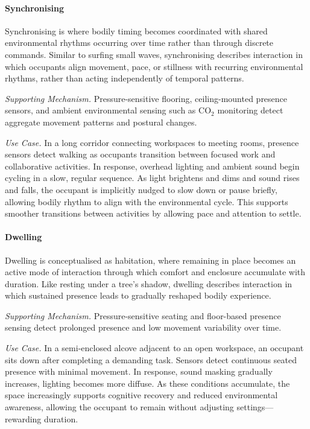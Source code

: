 \paragraph{\textbf{Synchronising}}
Synchronising is where bodily timing becomes coordinated with shared environmental rhythms occurring over time rather than through discrete commands. Similar to surfing small waves, synchronising describes interaction in which occupants align movement, pace, or stillness with recurring environmental rhythms, rather than acting independently of temporal patterns. 

\emph{Supporting Mechanism.} Pressure-sensitive flooring, ceiling-mounted presence sensors, and ambient environmental sensing such as CO$_2$ monitoring detect aggregate movement patterns and postural changes.

\emph{Use Case.} In a long corridor connecting workspaces to meeting rooms, presence sensors detect walking as occupants transition between focused work and collaborative activities. In response, overhead lighting and ambient sound begin cycling in a slow, regular sequence. As light brightens and dims and sound rises and falls, the occupant is implicitly nudged to slow down or pause briefly, allowing bodily rhythm to align with the environmental cycle. This supports smoother transitions between activities by allowing pace and attention to settle.

\paragraph{\textbf{Dwelling}}
Dwelling is conceptualised as habitation, where remaining in place becomes an active mode of interaction through which comfort and enclosure accumulate with duration. Like resting under a tree's shadow, dwelling describes interaction in which sustained presence leads to gradually reshaped bodily experience. 

\emph{Supporting Mechanism.} Pressure-sensitive seating and floor-based presence sensing detect prolonged presence and low movement variability over time.

\emph{Use Case.} In a semi-enclosed alcove adjacent to an open workspace, an occupant sits down after completing a demanding task. Sensors detect continuous seated presence with minimal movement. In response, sound masking gradually increases, lighting becomes more diffuse. As these conditions accumulate, the space increasingly supports cognitive recovery and reduced environmental awareness, allowing the occupant to remain without adjusting settings---rewarding duration.


